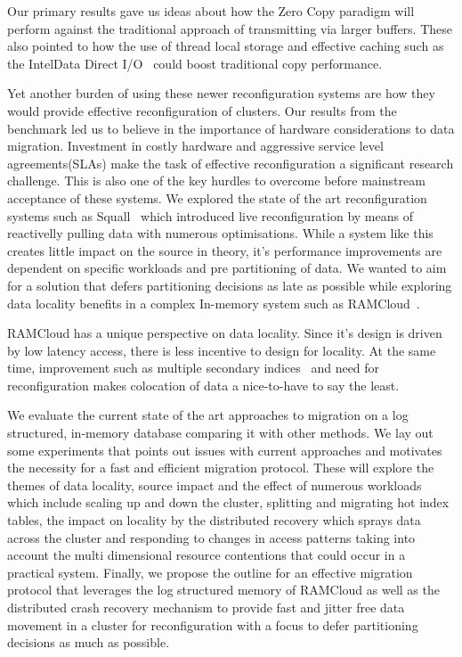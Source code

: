 Our primary results gave us ideas about how the Zero Copy paradigm will perform against
the traditional approach of transmitting via larger buffers. These also pointed to how the use of thread local storage and effective caching
such as the Intel\textregistered Data Direct I/O~\cite{ddio} could boost traditional copy performance. 

Yet another burden of using these newer reconfiguration systems are how they would provide effective 
reconfiguration of clusters. Our results from the benchmark led us to believe in the importance of 
hardware considerations to data migration. Investment in costly hardware and aggressive
service level agreements(SLAs) make the task of effective reconfiguration a significant research challenge. 
This is also one of the key hurdles to overcome before mainstream acceptance of these systems.
We explored the state of the art reconfiguration systems such as Squall~\cite{squall} which 
introduced live reconfiguration by means of reactivelly pulling data with numerous optimisations.
While a system like this creates little impact on the source in theory, it's performance improvements
are dependent on specific workloads and pre partitioning of data. We wanted to aim for a solution that defers 
partitioning decisions as late as possible while exploring data locality benefits in a complex
In-memory system such as RAMCloud~\cite{ramcloud}.


RAMCloud has a unique perspective on data locality. Since it's design is driven by low latency access, there is less incentive
to design for locality. At the same time, improvement such as multiple secondary indices~\cite{slik} and need for reconfiguration 
makes colocation of data a nice-to-have to say the least. 

We evaluate the current state of the art approaches to migration on a log structured,
in-memory database comparing it with other methods. We lay out some experiments
that points out issues with current approaches and motivates the necessity 
for a fast and efficient migration protocol. These will explore the themes of data locality,
source impact and the effect of numerous workloads which include scaling up and down the cluster, splitting
and migrating hot index tables, the impact on locality by the distributed recovery which sprays data across the 
cluster and responding to changes in access patterns taking into account the multi dimensional resource contentions
that could occur in a practical system. Finally, we propose the outline for an effective migration protocol that leverages
the log structured memory of RAMCloud as well as the distributed crash recovery mechanism
to provide fast and jitter free data movement in a cluster for reconfiguration with a focus to
defer partitioning decisions as much as possible.

